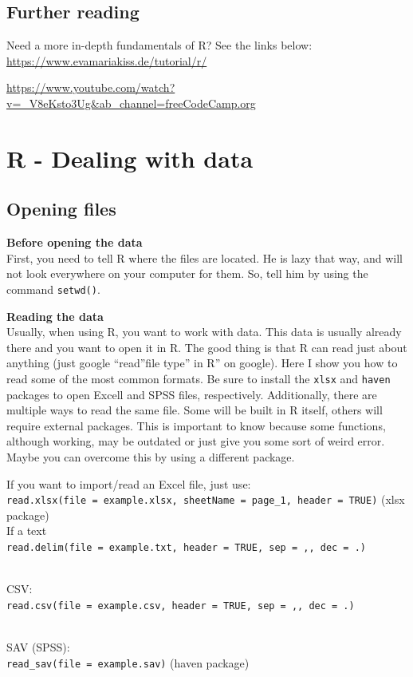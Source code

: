 \documentclass[
]{book}
\begin{document}
\hypertarget{further-reading}{%
\section{Further reading}\label{further-reading}}

Need a more in-depth fundamentals of R?
See the links below:\\
\url{https://www.evamariakiss.de/tutorial/r/}

\url{https://www.youtube.com/watch?v=_V8eKsto3Ug\&ab_channel=freeCodeCamp.org}

\hypertarget{r---dealing-with-data}{%
\chapter{R - Dealing with data}\label{r---dealing-with-data}}

\hypertarget{opening-files}{%
\section{Opening files}\label{opening-files}}

\textbf{Before opening the data}\\
First, you need to tell R where the files are located.
He is lazy that way, and will not look everywhere on your computer for them.
So, tell him by using the command \texttt{setwd()}.

\textbf{Reading the data}\\
Usually, when using R, you want to work with data.
This data is usually already there and you want to open it in R.
The good thing is that R can read just about anything (just google ``read''file type'' in R'' on google).
Here I show you how to read some of the most common formats.
Be sure to install the \texttt{xlsx} and \texttt{haven} packages to open Excell and SPSS files, respectively.
Additionally, there are multiple ways to read the same file.
Some will be built in R itself, others will require external packages.
This is important to know because some functions, although working, may be outdated or just give you some sort of weird error.
Maybe you can overcome this by using a different package.

If you want to import/read an Excel file, just use:\\
\texttt{read.xlsx(file\ =\ \textquotesingle{}example.xlsx\textquotesingle{},\ sheetName\ =\ \textquotesingle{}page\_1\textquotesingle{},\ header\ =\ TRUE)} (xlsx package)\\
If a text\\
\texttt{read.delim(file\ =\ \textquotesingle{}example.txt\textquotesingle{},\ header\ =\ TRUE,\ sep\ =\ \textquotesingle{},\textquotesingle{},\ dec\ =\ \textquotesingle{}.\textquotesingle{})}\strut \\
CSV:\\
\texttt{read.csv(file\ =\ \textquotesingle{}example.csv\textquotesingle{},\ header\ =\ TRUE,\ sep\ =\ \textquotesingle{},\textquotesingle{},\ dec\ =\ \textquotesingle{}.\textquotesingle{})}\strut \\
SAV (SPSS):\\
\texttt{read\_sav(file\ =\ \textquotesingle{}example.sav\textquotesingle{})} (haven package)
\end{document}
